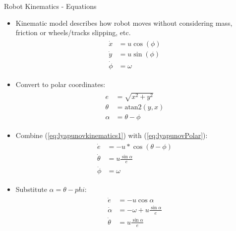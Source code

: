 \documentclass[hyperref={pdfpagelabels=false}]{beamer}
\begin{document}
\begin{frame}[allowframebreaks]{Robot Kinematics - Equations}
\begin{itemize}
\item Kinematic model describes how robot moves without considering mass, friction or wheels/tracks slipping, etc.
\begin{align}
\label{eq:lyapunovkinematics1}
\begin{split}
\dot{x} &= u\cos(\phi) \\
\dot{y} &= u\sin(\phi) \\
\dot{\phi} &= \omega
\end{split}
\end{align}
\item Convert to polar coordinates:
\begin{align}
\label{eq:lyapunovPolar}
\begin{split}
e &= \sqrt{x^2+y^2} \\
\theta &= \text{atan2}(y,x) \\
\alpha &= \theta - \phi
\end{split}
\end{align}
\item Combine (\ref{eq:lyapunovkinematics1}) with (\ref{eq:lyapunovPolar}):
\begin{align*}
\begin{split}
\dot{e} &= -u*\cos(\theta-\phi) \\
\dot{\theta} &= u\frac{\sin\alpha}{e} \\
\dot{\phi} &= \omega
\end{split}
\end{align*}
\item Substitute $\alpha=\theta-phi$:
\begin{align}
\label{eq:lyapunovkinematics}
\begin{split}
\dot{e} &= -u\cos\alpha \\
\dot{\alpha} &= -\omega + u\frac{\sin\alpha}{e} \\
\dot{\theta} &= u\frac{\sin\alpha}{e}
\end{split}
\end{align}
\end{itemize}
\end{frame}
\end{document}
